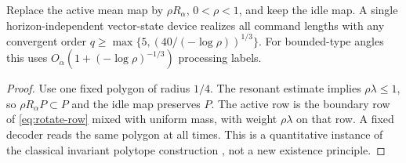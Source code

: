 \begin{corollary}\label{cor:contraction}
Replace the active mean map by $\rho R_\alpha$, $0<\rho<1$, and keep
the idle map. A single horizon-independent vector-state device realizes
all command lengths with any convergent order
$q\ge\max\{5,(40/(-\log\rho))^{1/3}\}$. For bounded-type angles this
uses $O_\alpha(1+(-\log\rho)^{-1/3})$ processing labels.
\end{corollary}
\begin{proof}
Use one fixed polygon of radius $1/4$. The resonant estimate implies
$\rho\lambda\le1$, so $\rho R_\alpha P\subset P$ and the idle map
preserves $P$. The active row is the boundary row of
\eqref{eq:rotate-row} mixed with uniform mass, with weight
$\rho\lambda$ on that row. A fixed decoder reads the same polygon at
all times. This is a quantitative instance of the classical invariant
polytope construction \cite{BF04}, not a new existence principle.
\end{proof}
